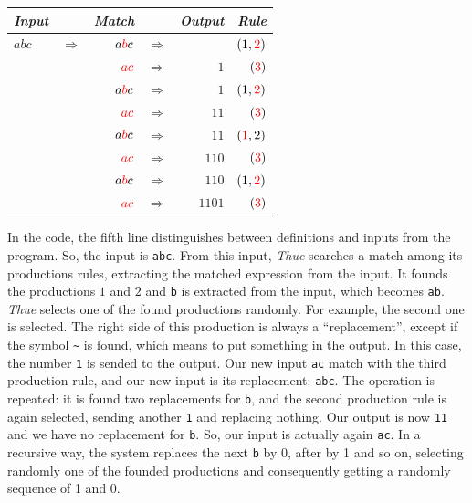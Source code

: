 \documentclass{article}
\begin{document}
\begin{center}
\begin{tabular}{lcrcrr}
  \textit{Input} & & \textit{Match} &  & \textit{Output} & \textit{Rule} \\
  \hline
  $abc$ & $\Rightarrow$ & $a\textcolor{red}{b}c$ & $\Rightarrow$ &       & $(1, \textcolor{red}{2})$ \\
        &               & $\textcolor{red}{ac}$  & $\Rightarrow$ & $1$   & $(\textcolor{red}{3})$    \\
        &               & $a\textcolor{red}{b}c$ & $\Rightarrow$ & $1$   & $(1, \textcolor{red}{2})$ \\
        &               & $\textcolor{red}{ac}$  & $\Rightarrow$ & $11$  & $(\textcolor{red}{3})$   \\
        &               & $a\textcolor{red}{b}c$ & $\Rightarrow$ & $11$  & $(\textcolor{red}{1}, 2)$ \\
        &               & $\textcolor{red}{ac}$  & $\Rightarrow$ & $110$ & $(\textcolor{red}{3})$   \\
        &               & $a\textcolor{red}{b}c$ & $\Rightarrow$ & $110$  & $(1, \textcolor{red}{2})$ \\
        &               & $\textcolor{red}{ac}$  & $\Rightarrow$ & $1101$ & $(\textcolor{red}{3})$   \\
\end{tabular}
\end{center}

In the code, the fifth line distinguishes between definitions and inputs from
the program. So, the input is \texttt{abc}. From this input, \textit{Thue}
searches a match among its productions rules, extracting the matched expression
from the input. It founds the productions $1$ and $2$ and \texttt{b} is
extracted from the input, which becomes \texttt{ab}. \textit{Thue} selects one
of the found productions randomly. For example, the second one is selected. The
right side of this production is always a ``replacement'', except if the symbol
\texttt{\~} is found, which means to put something in the output. In this case,
the number \texttt{1} is sended to the output. Our new input \texttt{ac} match
with the third production rule, and our new input is its replacement:
\texttt{abc}. The operation is repeated: it is found two replacements for
\texttt{b}, and the second production rule is again selected, sending another
\texttt{1} and replacing nothing. Our output is now \texttt{11} and we have no
replacement for \texttt{b}. So, our input is actually again \texttt{ac}. In a
recursive way, the system replaces the next \texttt{b} by 0, after by 1 and so
on, selecting randomly one of the founded productions and consequently getting a
randomly sequence of 1 and 0.
\end{document}
